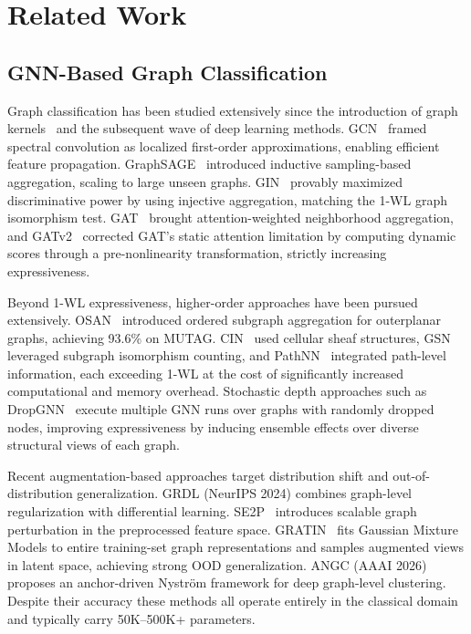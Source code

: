 \documentclass[journal]{IEEEtran}
\begin{document}
\section{Related Work}
\label{sec:related}

\subsection{GNN-Based Graph Classification}

Graph classification has been studied extensively since the introduction of
graph kernels~\cite{Vishwanathan2010,Shervashidze2011WL} and the subsequent
wave of deep learning methods. GCN~\cite{Kipf2017} framed spectral convolution
as localized first-order approximations, enabling efficient feature propagation.
GraphSAGE~\cite{Hamilton2017} introduced inductive sampling-based aggregation,
scaling to large unseen graphs. GIN~\cite{Xu2019GIN} provably maximized
discriminative power by using injective aggregation, matching the 1-WL graph
isomorphism test. GAT~\cite{Velickovic2018} brought attention-weighted
neighborhood aggregation, and GATv2~\cite{Brody2022ICLR} corrected GAT's
static attention limitation by computing dynamic scores through a
pre-nonlinearity transformation, strictly increasing expressiveness.

Beyond 1-WL expressiveness, higher-order approaches have been pursued
extensively. OSAN~\cite{Bause2023ICML} introduced ordered subgraph aggregation
for outerplanar graphs, achieving 93.6\% on MUTAG. CIN~\cite{Bodnar2021CIN}
used cellular sheaf structures, GSN~\cite{Bouritsas2022} leveraged subgraph
isomorphism counting, and PathNN~\cite{Michel2023PathNN} integrated path-level
information, each exceeding 1-WL at the cost of significantly increased
computational and memory overhead. Stochastic depth approaches such as
DropGNN~\cite{Papp2021NeurIPS} execute multiple GNN runs over graphs with
randomly dropped nodes, improving expressiveness by inducing ensemble effects
over diverse structural views of each graph.

Recent augmentation-based approaches target distribution shift and
out-of-distribution generalization. GRDL (NeurIPS 2024) combines
graph-level regularization with differential learning. SE2P~\cite{Saber2024CIKM}
introduces scalable graph perturbation in the preprocessed feature space.
GRATIN~\cite{Abbahaddou2025ICML} fits Gaussian Mixture Models to entire
training-set graph representations and samples augmented views in latent space,
achieving strong OOD generalization. ANGC (AAAI 2026) proposes an anchor-driven
Nystr\"om framework for deep graph-level clustering. Despite their accuracy
these methods all operate entirely in the classical domain and typically
carry 50K--500K+ parameters.
\end{document}
